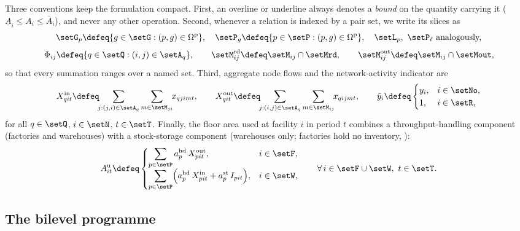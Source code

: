 Three conventions keep the formulation compact. First, an overline or
underline always denotes a \emph{bound} on the quantity carrying it
($\underline{A}_i\le A_i\le\overline{A}_i$), and never any other
operation. Second, whenever a relation is indexed by a pair set, we
write its slices as
\begin{equation}
\setG_p\defeq\{g\in\setG:(p,g)\in\Omega^{\mathrm{p}}\},\quad
\setP_g\defeq\{p\in\setP:(p,g)\in\Omega^{\mathrm{p}}\},\quad
\setL_p,\ \setP_{\ell}\ \text{analogously,}
\label{eq:slices}
\end{equation}
\begin{equation}
\Phi_{ij}\defeq\{q\in\setQ:(i,j)\in\setA_q\},\qquad
\Mrdij\defeq\setM_{ij}\cap\setMrd,\qquad
\Moutij\defeq\setM_{ij}\cap\setMout ,
\label{eq:slices2}
\end{equation}
so that every summation ranges over a named set. Third, aggregate node
flows and the network-activity indicator are
\begin{equation}
X^{\mathrm{in}}_{qit}\defeq\!\!\sum_{j:(j,i)\in\setA_q}\sum_{m\in\setM_{ji}}\!\! x_{qjimt},
\qquad
X^{\mathrm{out}}_{qit}\defeq\!\!\sum_{j:(i,j)\in\setA_q}\sum_{m\in\setM_{ij}}\!\! x_{qijmt},
\qquad
\tilde{y}_i\defeq
\begin{cases}
y_i, & i\in\setNo,\\
1,   & i\in\setR,
\end{cases}
\label{eq:flows}
\end{equation}
for all $q\in\setQ$, $i\in\setN$, $t\in\setT$. Finally, the floor area
used at facility $i$ in period $t$ combines a throughput-handling
component (factories and warehouses) with a stock-storage component
(warehouses only; factories hold no inventory, ):
\begin{equation}
A^{\mathrm{u}}_{it}\defeq
\begin{cases}
\displaystyle\sum_{p\in\setP} a^{\mathrm{hd}}_p\,X^{\mathrm{out}}_{pit},
  & i\in\setF,\\[1.0em]
\displaystyle\sum_{p\in\setP}\Bigl(a^{\mathrm{hd}}_p\,X^{\mathrm{in}}_{pit}
  + a^{\mathrm{st}}_p\,I_{pit}\Bigr),
  & i\in\setW,
\end{cases}
\qquad \forall\, i\in\setF\cup\setW,\ t\in\setT .
\label{eq:used_area}
\end{equation}

\subsection{The bilevel programme}
\label{sec:model:bilevel}

